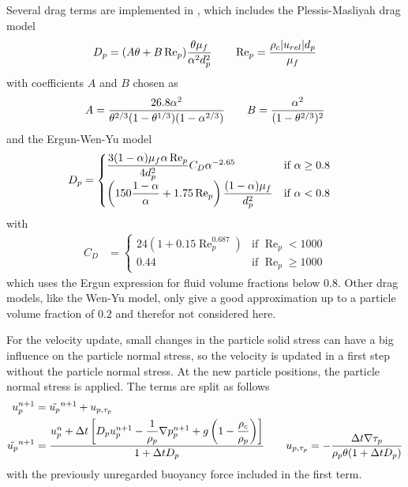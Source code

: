 Several drag terms are implemented in \OFns, which includes the Plessis-Masliyah drag model \cite{Plessis}
\begin{equation}
\label{eq:PMDrag}
    D_p = (A \theta +B \operatorname{Re}_p) \dfrac{\theta \mu_f}{\alpha^2 d_p^2} \qquad \operatorname{Re}_p = \dfrac{\rho_c \lvert u_{rel} \rvert d_p}{\mu_f}
\end{equation}
with coefficients $A$ and $B$ chosen as
\begin{equation}
    A = \dfrac{26.8 \alpha^2}{\theta^{2/3}(1-\theta^{1/3})(1-\alpha^{2/3})} \qquad B = \dfrac{\alpha^2}{(1-\theta^{2/3})^2}
\end{equation}
and the Ergun-Wen-Yu model \cite{ErgunWenYu}
\begin{align}
\label{eq:EWYDrag}
    D_p &= \begin{cases}
        \dfrac{3 (1-\alpha) \mu_f \alpha \operatorname{Re}_p}{4 d_p^2} C_D \alpha^{-2.65} & \text{if } \alpha \geq 0.8 \\
        \left(150 \dfrac{1-\alpha}{\alpha} + 1.75 \operatorname{Re}_p \right) \dfrac{(1-\alpha) \mu_f}{d_p^2} & \text{if } \alpha < 0.8
    \end{cases}
\end{align}
with
\begin{align}
    C_D &= \begin{cases}
        24 \left(1+0.15 \operatorname{Re}_p^{0.687}\right) & \text{if } \operatorname{Re}_p < 1000 \\
        0.44 & \text{if } \operatorname{Re}_p \geq 1000
    \end{cases}
\end{align}
which uses the Ergun expression for fluid volume fractions below $0.8$.
Other drag models, like the Wen-Yu model, only give a good approximation up to a particle volume fraction of $0.2$ and therefor not considered here.

For the velocity update, small changes in the particle solid stress can have a big influence on the particle normal stress, so the velocity is updated in a first step without the particle normal stress. 
At the new particle positions, the particle normal stress is applied.
The terms are split as follows
\begin{align}
    u_p^{n+1} & = \tilde{u_p}^{n+1} + u_{p,\tau_p} \\
    \tilde{u_p}^{n+1} &= \dfrac{u_p^n + \Delta t \left[ D_p u_p^{n+1} - \dfrac{1}{\rho_p} \nabla p_p^{n+1} + g \left( 1- \dfrac{\rho_c}{\rho_p}\right) \right]}{1 + \Delta t D_p} \qquad u_{p,\tau_p} = - \dfrac{\Delta t \nabla \tau_p}{\rho_p \theta (1+\Delta t D_p)}
\end{align}
with the previously unregarded buoyancy force included in the first term.


